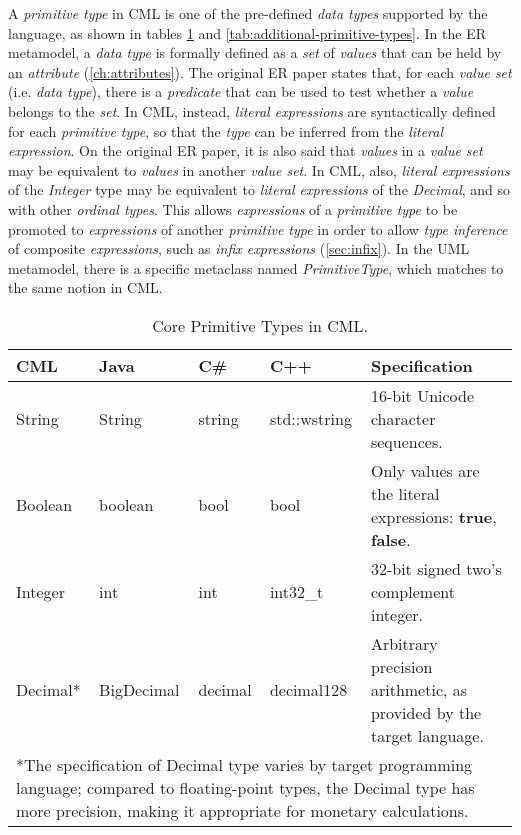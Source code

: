 \begin{definition}
A \emph{primitive type} in CML is one of the pre-defined \emph{data types}
supported by the language,
as shown in tables \ref{tab:core-primitive-types} and \ref{tab:additional-primitive-types}.
In the ER \cite{er} metamodel,
a \emph{data type} is formally defined as a \emph{set} of \emph{values}
that can be held by an \emph{attribute} (\ref{ch:attributes}).
The original ER paper \cite{er} states that,
for each \emph{value set} (i.e. \emph{data type}),
there is a \emph{predicate} that can be used to test
whether a \emph{value} belongs to the \emph{set}.
In CML, instead,
\emph{literal expressions} are syntactically defined for each \emph{primitive type},
so that the \emph{type} can be inferred from the \emph{literal expression}.
On the original ER paper,
it is also said that \emph{values} in a \emph{value set}
may be equivalent to \emph{values} in another \emph{value set}.
In CML, also,
\emph{literal expressions} of the \emph{Integer} type may be equivalent 
to \emph{literal expressions} of the \emph{Decimal},
and so with other \emph{ordinal types}.
This allows \emph{expressions} of a \emph{primitive type}
to be promoted to \emph{expressions} of another \emph{primitive type}
in order to allow \emph{type inference} of composite \emph{expressions},
such as \emph{infix expressions} (\ref{sec:infix}).
In the UML \cite{uml} metamodel,
there is a specific metaclass named \emph{PrimitiveType},
which matches to the same notion in CML.
\end{definition}

\begin{table}[h]
\centering
\begin{tabular}
{l l l l p{5.5cm} }
\hline
CML & Java & C\# & C++ & Specification \\
\hline
String & String & string & std::wstring & 16-bit Unicode character sequences. \\
Boolean & boolean & bool & bool & Only values are the literal expressions: \textbf{true}, \textbf{false}. \\
Integer & int & int & int32\_t & 32-bit signed two's complement integer. \\
Decimal* & BigDecimal & decimal & decimal128 & Arbitrary precision arithmetic,
as provided by the target language. \\
\multicolumn{5}{p{14cm}}{*The specification of Decimal type varies by target programming language;
compared to floating-point types, the Decimal type has more precision,
making it appropriate for monetary calculations.}
\end{tabular}
\caption{Core Primitive Types in CML.}
\label{tab:core-primitive-types}
\end{table}

